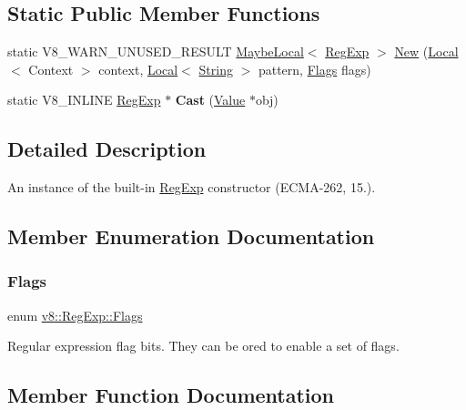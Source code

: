 \subsection*{Static Public Member Functions}
\begin{DoxyCompactItemize}
\item 
static V8\+\_\+\+W\+A\+R\+N\+\_\+\+U\+N\+U\+S\+E\+D\+\_\+\+R\+E\+S\+U\+LT \mbox{\hyperlink{classv8_1_1MaybeLocal}{Maybe\+Local}}$<$ \mbox{\hyperlink{classv8_1_1RegExp}{Reg\+Exp}} $>$ \mbox{\hyperlink{classv8_1_1RegExp_a805f632fe98d58160773a4ba1e424b15}{New}} (\mbox{\hyperlink{classv8_1_1Local}{Local}}$<$ Context $>$ context, \mbox{\hyperlink{classv8_1_1Local}{Local}}$<$ \mbox{\hyperlink{classv8_1_1String}{String}} $>$ pattern, \mbox{\hyperlink{classv8_1_1RegExp_aa4718a5c1f18472aff3bf51ed694fc5a}{Flags}} flags)
\item 
\mbox{\label{classv8_1_1RegExp_ab3f85572312815cbdf5ee368d358c40f}} 
static V8\+\_\+\+I\+N\+L\+I\+NE \mbox{\hyperlink{classv8_1_1RegExp}{Reg\+Exp}} $\ast$ {\bfseries Cast} (\mbox{\hyperlink{classv8_1_1Value}{Value}} $\ast$obj)
\end{DoxyCompactItemize}


\subsection{Detailed Description}
An instance of the built-\/in \mbox{\hyperlink{classv8_1_1RegExp}{Reg\+Exp}} constructor (E\+C\+M\+A-\/262, 15.). 

\subsection{Member Enumeration Documentation}
\mbox{\label{classv8_1_1RegExp_aa4718a5c1f18472aff3bf51ed694fc5a}} 
\subsubsection{\texorpdfstring{Flags}{Flags}}
{\footnotesize\ttfamily enum \mbox{\hyperlink{classv8_1_1RegExp_aa4718a5c1f18472aff3bf51ed694fc5a}{v8\+::\+Reg\+Exp\+::\+Flags}}}

Regular expression flag bits. They can be or\textquotesingle{}ed to enable a set of flags. 

\subsection{Member Function Documentation}
\mbox{\label{classv8_1_1RegExp_aaf00a07b6f8368a1a99bf0bac327af21}} 
